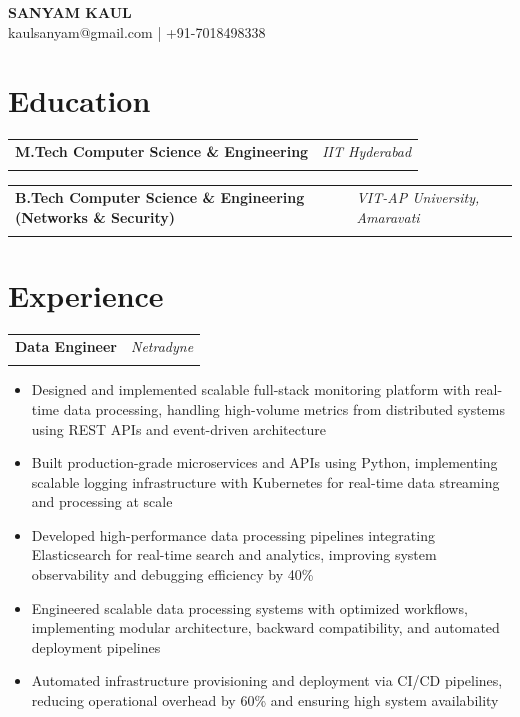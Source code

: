 \documentclass[11pt,a4paper]{article}
\makeatletter
\newcommand{\resumeItem}[1]{\item\small{#1}}
\newlength{\resumeLeftCol}
\newlength{\resumeRightCol}
\newcommand{\resumeHeading}[4]{
  \begin{tabular*}{\textwidth}{@{}p{\resumeLeftCol}@{\extracolsep{\fill}}>{\raggedleft\arraybackslash}p{\resumeRightCol}@{}}
    \textbf{#1} & \textit{#2} \\
    & \textit{\ifstrempty{#4}{#3}{#3 \ #4}}
  \end{tabular*}
  \vspace{-4pt}
}
\makeatother
\begin{document}
\begin{center}
    {\Huge\bfseries SANYAM KAUL} \\
    \vspace{2pt}
    \small kaulsanyam@gmail.com | +91-7018498338
\end{center}

\section{Education}
\resumeHeading{M.Tech Computer Science \& Engineering}{IIT Hyderabad}{2025}{CGPA: 8.90}
\resumeHeading{B.Tech Computer Science \& Engineering (Networks \& Security)}{VIT-AP University, Amaravati}{2021}{CGPA: 8.90}

\section{Experience}
\resumeHeading{Data Engineer}{Netradyne}{July 2025 - Present}{}
\begin{itemize}[leftmargin=*,noitemsep,topsep=0pt]
    \resumeItem{Designed and implemented scalable full-stack monitoring platform with real-time data processing, handling high-volume metrics from distributed systems using REST APIs and event-driven architecture}
    \resumeItem{Built production-grade microservices and APIs using Python, implementing scalable logging infrastructure with Kubernetes for real-time data streaming and processing at scale}
    \resumeItem{Developed high-performance data processing pipelines integrating Elasticsearch for real-time search and analytics, improving system observability and debugging efficiency by 40\%}
    \resumeItem{Engineered scalable data processing systems with optimized workflows, implementing modular architecture, backward compatibility, and automated deployment pipelines}
    \resumeItem{Automated infrastructure provisioning and deployment via CI/CD pipelines, reducing operational overhead by 60\% and ensuring high system availability}
\end{itemize}
\end{document}
